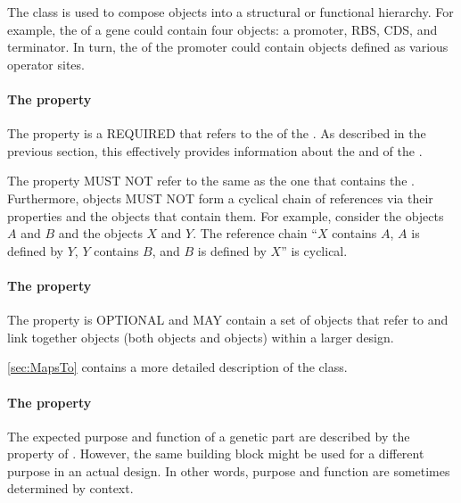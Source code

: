 The  class is used to compose  objects into a structural or functional hierarchy. For example, the  of a gene could contain four  objects: a promoter, RBS, CDS, and terminator. In turn, the  of the promoter  could contain  objects defined as various operator sites.

\paragraph{The  property}
\label{sec:instanceOf}

The  property is a REQUIRED  that refers to the  of the .
As described in the previous section, this  effectively provides information about the  and  of the .

The  property MUST NOT refer to the same  as the one that contains the .
Furthermore,  objects MUST NOT form a cyclical chain of references via their  properties and the  objects that contain them.
For example, consider the  objects $A$ and $B$ and the  objects $X$ and $Y$. The reference chain ``$X$ contains $A$, $A$ is defined by $Y$, $Y$ contains $B$, and $B$ is defined by $X$'' is cyclical.

\paragraph{The  property}\label{sec:mapsTos:CI}

The  property is OPTIONAL and MAY contain a set of  objects that refer to and link together  objects (both  objects and  objects) within a larger design.

\ref{sec:MapsTo} contains a more detailed description of the  class.


\paragraph{The  property}\label{sec:roles:C}

The expected purpose and function of a genetic part are described by the
 property of . However, the same building block might be used for a different purpose in an actual design. In other words, purpose and function are sometimes determined by context. 

